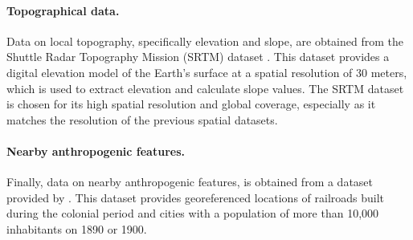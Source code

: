 \paragraph{Topographical data.}
Data on local topography, specifically elevation and slope, are obtained from the Shuttle Radar Topography Mission (SRTM) dataset \parencite{farrShuttleRadarTopography2007}.
This dataset provides a digital elevation model of the Earth's surface at a spatial resolution of 30 meters, which is used to extract elevation and calculate slope values.
The SRTM dataset is chosen for its high spatial resolution and global coverage, especially as it matches the resolution of the previous spatial datasets.

\paragraph{Nearby anthropogenic features.}
Finally, data on nearby anthropogenic features, is obtained from a dataset provided by \cite{jedwabPermanentEffectsTransportation2016}.
This dataset provides georeferenced locations of railroads built during the colonial period and cities with a population of more than 10,000 inhabitants on 1890 or 1900.